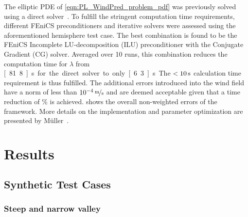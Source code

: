 \documentclass[twocolumn,letterpaper]{IEEEAerospaceCLS}
\begin{document}
The elliptic \ac{PDE} of \cref{eqn:PL_WindPred_problem_pdf} was previously solved using a direct solver~\cite{Walt2016}. To fulfill the stringent computation time requirements, different FEniCS preconditioners and iterative solvers were assessed using the aforementioned hemisphere test case. The best combination is found to be the FEniCS Incomplete LU-decomposition (ILU) preconditioner with the Conjugate Gradient (CG) solver. Averaged over 10 runs, this combination reduces the computation time for $\lambda$ from \unit[81.8]{s} for the direct solver to only \unit[6.3]{s}. The $<\unit[10]{s}$ calculation time requirement is thus fulfilled. The additional errors introduced into the wind field have a norm of less than $\unitfrac[10^{-4}]{m}{s}$ and are deemed acceptable given that a time reduction of \unit[92]{\%} is achieved.  shows the overall non-weighted errors of the framework. More details on the implementation and parameter optimization are presented by M{\"u}ller~\cite{Mueller_MT_WindPrediction}.

\section{Results}
\label{sec:PL_WindPred_Results}

\subsection{Synthetic Test Cases}
\label{sec:PL_WindPred_PrelResults_Synthetic}

\subsubsection{Steep and narrow valley}
\label{sec:PL_WindPred_valley}
\end{document}
